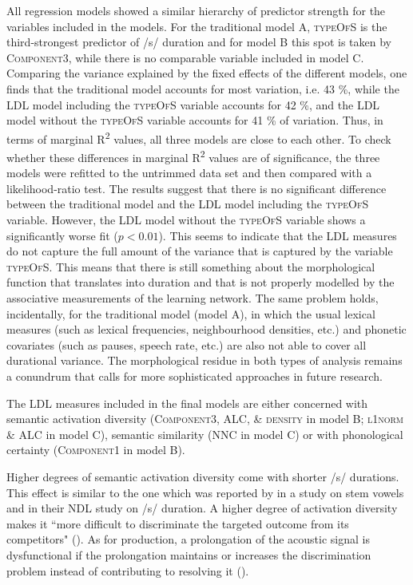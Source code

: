 All regression models showed a similar hierarchy of predictor strength for the variables included in the models. For the traditional model A, \textsc{typeOfS} is the third-strongest predictor of /s/ duration and for model B this spot is taken by \textsc{Component3}, while there is no comparable variable included in model C. Comparing the variance explained by the fixed effects of the different models, one finds that the traditional model accounts for most variation, i.e. 43 \%, while the LDL model including the \textsc{typeOfS} variable accounts for 42 \%, and the LDL model without the \textsc{typeOfS} variable accounts for 41 \% of variation. Thus, in terms of marginal R\textsuperscript{2} values, all three models are close to each other. To check whether these differences in marginal R\textsuperscript{2} values are of significance, the three models were refitted to the untrimmed data set and then compared with a likelihood-ratio test. The results suggest that there is no significant difference between the traditional model and the LDL model including the \textsc{typeOfS} variable. However, the LDL model without the \textsc{typeOfS} variable shows a significantly worse fit ($p<0.01$). This seems to indicate that the LDL measures do not capture the full amount of the variance that is captured by the variable \textsc{typeOfS}. This means that there is still something about the morphological function that translates into duration and that is not properly modelled by the associative measurements of the learning network. The same problem holds, incidentally, for the traditional model (model A), in which the usual lexical measures (such as lexical frequencies, neighbourhood densities, etc.) and phonetic covariates (such as pauses, speech rate, etc.) are also not able to cover all durational variance. The morphological residue in both types of analysis remains a conundrum that calls for more sophisticated approaches in future research.

The LDL measures included in the final models are either concerned with semantic activation diversity (\textsc{Component3}, \textsc{ALC}, \& \textsc{density} in model B; \textsc{l1norm} \& \textsc{ALC} in model C), semantic similarity (\textsc{NNC} in model C) or with phonological certainty (\textsc{Component1} in model B).

Higher degrees of semantic activation diversity come with shorter /s/ durations. This effect is similar to the one which was reported by \citet{Tucker2019Sims} in a study on stem vowels and \citet{Tomaschek2019} in their NDL study on /s/ duration. A higher degree of activation diversity makes it ``more difficult to discriminate the targeted outcome from its competitors" (\cite[27]{Tomaschek2019}). As for production, a prolongation of the acoustic signal is dysfunctional if the prolongation maintains or increases the discrimination problem instead of contributing to resolving it (\cite{Tomaschek2019}).

